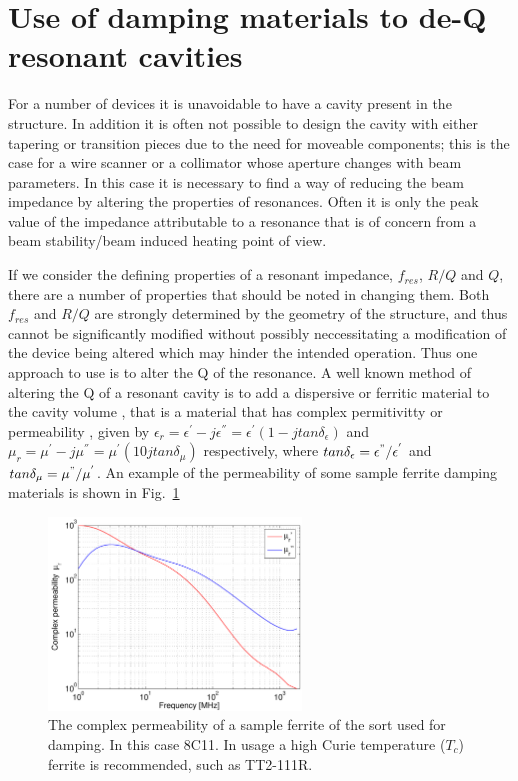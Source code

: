 \section{Use of damping materials to de-Q resonant cavities}
\label{sec:damping_materials}

For a number of devices it is unavoidable to have a cavity present in the structure. In addition it is often not possible to design the cavity with either tapering or transition pieces due to the need for moveable components; this is the case for a wire scanner or a collimator whose aperture changes with beam parameters. In this case it is necessary to find a way of reducing the beam impedance by altering the properties of resonances. Often it is only the peak value of the impedance attributable to a resonance that is of concern from a beam stability/beam induced heating point of view. 

If we consider the defining properties of a resonant impedance, $f_{res}$, $R/Q$ and $Q$, there are a number of properties that should be noted in changing them. Both $f_{res}$ and $R/Q$ are strongly determined by the geometry of the structure, and thus cannot be significantly modified without possibly neccessitating a modification of the device being altered which may hinder the intended operation. Thus one approach to use is to alter the Q of the resonance. A well known method of altering the Q of a resonant cavity is to add a dispersive or ferritic material to the cavity volume \cite{Klingbeil:ferrCav}, that is a material that has complex permitivitty or permeability , given by $\epsilon_{r} = \epsilon^{'} - j \epsilon^{''} = \epsilon^{'}(1-jtan\delta_{\epsilon})$ and $\mu_{r} = \mu^{'} - j \mu^{''} = \mu^{'}(10jtan\delta_{\mu})$ respectively, where $tan\delta_{\epsilon} = \epsilon^{"}/\epsilon^{'}$ and $tan\delta_{\mu}=\mu^{"}/\mu^{'}$. An example of the permeability of some sample ferrite damping materials is shown in Fig.~\ref{fig:ferr_mu_damp}

\begin{figure}
\begin{center}
\includegraphics[width=0.6\textwidth]{Beam_Coupling_Impedance_Reduction_Techniques/figures/Ferrite8C11.pdf}
\end{center}
\caption{The complex permeability of a sample ferrite of the sort used for damping. In this case 8C11. In usage a high Curie temperature ($T_{c}$) ferrite is recommended, such as TT2-111R.}
\label{fig:ferr_mu_damp}
\end{figure}


